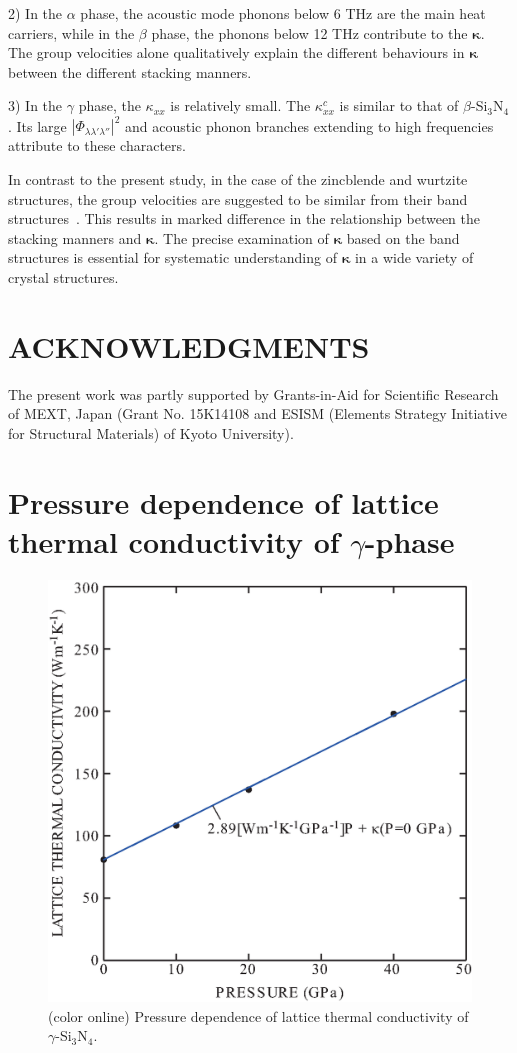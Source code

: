 \documentclass[twocolumn,amsmath,amssymb,a4paper,prb,superscriptaddress,floatfix]{revtex4-1}
\begin{document}
2) In the $\alpha$ phase, the acoustic mode phonons below 6 THz are the main
heat carriers, while in the $\beta$ phase, the phonons below 12 THz contribute
to the $\boldsymbol{\kappa}$. The group velocities alone qualitatively explain
the different behaviours in $\boldsymbol{\kappa}$ between the different stacking
manners.

3) In the $\gamma$ phase, the $\kappa_{xx}$ is relatively small. The
$\kappa^c_{xx}$ is similar to that of $\beta$-Si$_3$N$_4$. Its large
$|\Phi_{\lambda\lambda'\lambda''}|^2$ and acoustic phonon branches extending to
high frequencies attribute to these characters.

In contrast to the present study, in the case of the zincblende and wurtzite
structures, the group velocities are suggested to be similar from their band
structures~\cite{phono3py}. This results in marked difference in the
relationship between the stacking manners and $\boldsymbol{\kappa}$. The precise
examination of $\boldsymbol{\kappa}$ based on the band structures is essential
for systematic understanding of $\boldsymbol{\kappa}$ in a wide variety of
crystal structures. 

\section*{ACKNOWLEDGMENTS}
The present work was partly supported by Grants-in-Aid for Scientific
Research of MEXT, Japan (Grant No. 15K14108 and ESISM (Elements Strategy
Initiative for Structural Materials) of Kyoto University).

\appendix
\section{Pressure dependence of lattice thermal conductivity of $\gamma$-phase}
\begin{figure}[ht]
 \begin{center}
  \includegraphics[width=0.80\linewidth]{S1.eps} \caption{(color online)
  Pressure dependence of lattice thermal conductivity of $\gamma$-Si$_3$N$_4$.  \label{fig:S1} }
 \end{center}
\end{figure}

\end{document}
